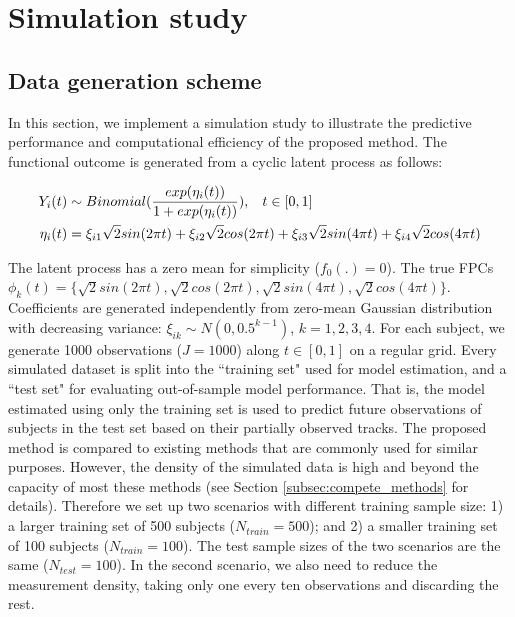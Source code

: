 \documentclass[12pt]{article}
\begin{document}
\section{Simulation study}
\label{sec:simulation}

\subsection{Data generation scheme}
\label{subser:gen_data}

In this section, we implement a simulation study to illustrate the predictive performance and
computational efficiency of the proposed method. The functional outcome is generated from a cyclic latent process as follows:

\[
\begin{aligned}
Y_i(t) & \sim Binomial(\frac{exp(\eta_i(t))}{1+exp(\eta_i(t))}), \hspace{0.3cm} t  \in [0, 1] \\
\eta_i(t) &=\xi_{i1}\sqrt{2}sin(2\pi t)+\xi_{i2}\sqrt{2}cos(2\pi t)+\xi_{i3}\sqrt{2}sin(4\pi t)+\xi_{i4}\sqrt{2}cos(4\pi t)\\
\end{aligned}
\]

The latent process has a zero mean for simplicity ($f_0(.) = 0$). The true FPCs $\phi_k(t) = \{\sqrt{2}sin(2\pi t), \sqrt{2}cos(2\pi t), \sqrt{2}sin(4\pi t), \sqrt{2}cos(4\pi t) \}$. Coefficients are generated independently from zero-mean Gaussian distribution with decreasing variance: $\xi_{ik} \sim N(0, 0.5^{k-1})$, $k=1, 2, 3, 4$. For each subject, we generate 1000 observations ($J = 1000$) along $t \in [0, 1]$ on a regular grid. Every simulated dataset is split into the ``training set" used for model estimation, and a ``test set" for evaluating out-of-sample model performance. That is, the model estimated using only the training set is used to predict future observations of subjects in the test set based on their partially observed tracks. The proposed method is compared to existing methods that are commonly used for similar purposes. However, the density of the simulated data is high and beyond the capacity of most these methods (see Section \ref{subsec:compete_methods} for details). Therefore we set up two scenarios with different training sample size: 1) a larger training set of 500 subjects ($N_{train} = 500$); and 2) a smaller training set of 100 subjects ($N_{train} = 100$). The test sample sizes of the two scenarios are the same ($N_{test} = 100$). In the second scenario, we also need to reduce the measurement density, taking only one every ten observations and discarding the rest.
\end{document}
